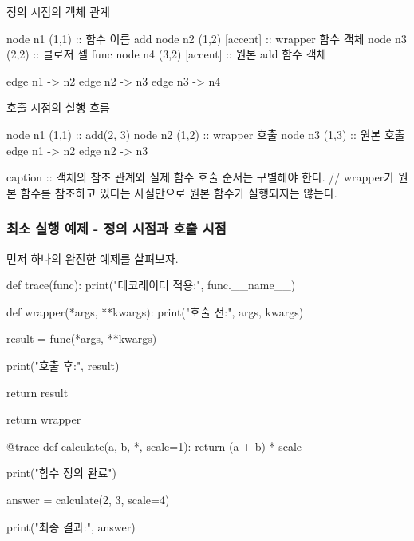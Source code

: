 \begin{dhknote}
\begin{dhksmry}[centered]
정의 시점의 객체 관계
\end{dhksmry}
\end{dhknote}

\begin{dhkgraph}[uniform]
node n1 (1,1) :: 함수 이름 add
node n2 (1,2) [accent] :: wrapper 함수 객체
node n3 (2,2) :: 클로저 셀 func
node n4 (3,2) [accent] :: 원본 add 함수 객체

edge n1 -> n2
edge n2 -> n3
edge n3 -> n4
\end{dhkgraph}

\begin{dhknote}
\begin{dhksmry}[centered]
호출 시점의 실행 흐름
\end{dhksmry}
\end{dhknote}

\begin{dhkgraph}[uniform]
node n1 (1,1) :: add(2, 3)
node n2 (1,2) :: wrapper 호출
node n3 (1,3) :: 원본 호출
edge n1 -> n2
edge n2 -> n3

caption :: 객체의 참조 관계와 실제 함수 호출 순서는 구별해야 한다. // wrapper가 원본 함수를 참조하고 있다는 사실만으로 원본 함수가 실행되지는 않는다.
\end{dhkgraph}

\subsubsection{최소 실행 예제 - 정의 시점과 호출 시점}

먼저 하나의 완전한 예제를 살펴보자.

\begin{dhkcode}
def trace(func):
    print("데코레이터 적용:", func.__name__)

    def wrapper(*args, **kwargs):
        print("호출 전:", args, kwargs)

        result = func(*args, **kwargs)

        print("호출 후:", result)

        return result

    return wrapper


@trace
def calculate(a, b, *, scale=1):
    return (a + b) * scale


print("함수 정의 완료")

answer = calculate(2, 3, scale=4)

print("최종 결과:", answer)
\end{dhkcode}

